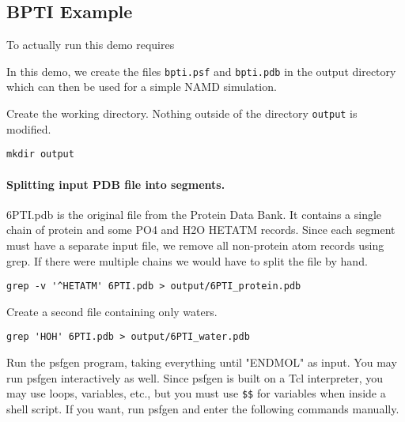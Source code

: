 \subsection{BPTI Example}

To actually run this demo requires

In this demo, we create the files \verb#bpti.psf# and \verb#bpti.pdb# in the output directory
which can then be used for a simple NAMD simulation.

Create the working directory.  Nothing outside of the directory \verb#output# is modified.

\begin{verbatim}
mkdir output
\end{verbatim}

\paragraph*{Splitting input PDB file into segments.}

6PTI.pdb is the original file from the Protein Data Bank.  It contains
a single chain of protein and some PO4 and H2O HETATM records.  Since
each segment must have a separate input file, we remove all non-protein
atom records using grep.  If there were multiple chains we would have
to split the file by hand.
\begin{verbatim}
grep -v '^HETATM' 6PTI.pdb > output/6PTI_protein.pdb
\end{verbatim}

Create a second file containing only waters.
\begin{verbatim}
grep 'HOH' 6PTI.pdb > output/6PTI_water.pdb
\end{verbatim}


Run the psfgen program, taking everything until "ENDMOL" as input.
You may run psfgen interactively as well.  Since psfgen is built on
a Tcl interpreter, you may use loops, variables, etc., but you must
use \verb#$$# for variables when inside a shell script.  If you
want, run psfgen and enter the following commands manually.

